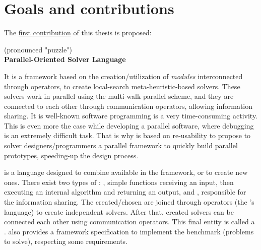 \section{Goals and contributions}

The \underline{first contribution} of this thesis is proposed: 
\begin{center}
\posl{} (pronounced "puzzle")\\
\textbf{Parallel-Oriented Solver Language}
\end{center}
It is a framework based on the creation/utilization of \textit{modules} interconnected through operators, to create local-search meta-heuristic-based solvers. These solvers work in parallel using the multi-walk parallel scheme, and they are connected to each other through communication operators, allowing information sharing. It is well-known software programming is a very time-consuming activity. This is even more the case while developing a parallel software, where debugging is an extremely difficult task. That is why \posl{} is based on re-usability to propose to \csp{} solver designers/programmers a parallel framework to quickly build parallel prototypes, speeding-up the design process.

\posl{} is a language designed to combine \ms{} available in the framework, or to create new ones. There exist two types of \ms{}: \oms{}, simple functions receiving an input, then executing an internal algorithm and returning an output, and \opchs{}, responsible for the information sharing.
The created/chosen \ms{} are joined through operators (the \posl's language) to create independent solvers. After that, created solvers can be connected each other using communication operators. This final entity is called a \soset. \posl{} also provides a framework specification to implement the benchmark (problems to solve), respecting some requirements.


